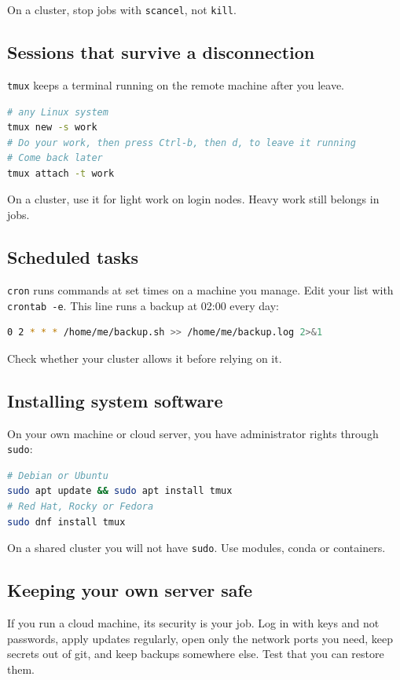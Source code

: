On a cluster, stop jobs with \texttt{scancel}, not \texttt{kill}.

\subsection{Sessions that survive a disconnection}\label{sessions-that-survive-a-disconnection}

\texttt{tmux} keeps a terminal running on the remote machine after you leave.

\begin{lstlisting}[language=bash]
# any Linux system
tmux new -s work
# Do your work, then press Ctrl-b, then d, to leave it running
# Come back later
tmux attach -t work
\end{lstlisting}

On a cluster, use it for light work on login nodes. Heavy work still belongs in jobs.

\subsection{Scheduled tasks}\label{scheduled-tasks}

\texttt{cron} runs commands at set times on a machine you manage. Edit your list with \texttt{crontab\ -e}. This line runs a backup at 02:00 every day:

\begin{lstlisting}[language=bash]
0 2 * * * /home/me/backup.sh >> /home/me/backup.log 2>&1
\end{lstlisting}

Check whether your cluster allows it before relying on it.

\subsection{Installing system software}\label{installing-system-software}

On your own machine or cloud server, you have administrator rights through \texttt{sudo}:

\begin{lstlisting}[language=bash]
# Debian or Ubuntu
sudo apt update && sudo apt install tmux
# Red Hat, Rocky or Fedora
sudo dnf install tmux
\end{lstlisting}

On a shared cluster you will not have \texttt{sudo}. Use modules, conda or containers.

\subsection{Keeping your own server safe}\label{keeping-your-own-server-safe}

If you run a cloud machine, its security is your job. Log in with keys and not passwords, apply updates regularly, open only the network ports you need, keep secrets out of git, and keep backups somewhere else. Test that you can restore them.

